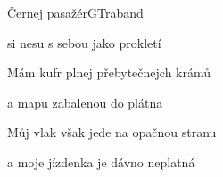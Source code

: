 \begin{song}{Černej pasažér}{G}{Traband}
\begin{SBVerse}
si nesu s sebou jako prokletí

\end{SBVerse}

\begin{SBChorus}

\end{SBChorus}

\begin{SBVerse}

Mám kufr plnej přebytečnejch krámů

a mapu zabalenou do plátna

Můj vlak však jede na opačnou stranu

a moje jízdenka je dávno neplatná 

\end{SBVerse}

\end{song}

\clearpage
